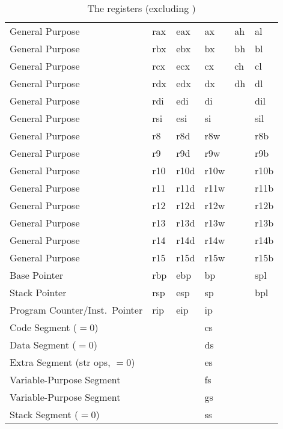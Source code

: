 \begin{table*}
  \centering
  \appto\theadfont{\normalcolor\normalfont}
  \caption{The  registers (excluding )}\label{tbl:regs}
  \begin{threeparttable}
    \begin{tabular}{lAAAAA}
      \toprule
       &  &  &
       &  &  \\
      \midrule
      General Purpose & rax & eax & ax & ah & al \\
      General Purpose & rbx & ebx & bx & bh & bl \\
      General Purpose & rcx & ecx & cx & ch & cl \\
      General Purpose & rdx & edx & dx & dh & dl \\
      General Purpose & rdi & edi & di && dil \\
      General Purpose & rsi & esi & si && sil \\
      General Purpose & r8 & r8d & r8w && r8b \\
      General Purpose & r9 & r9d & r9w && r9b \\
      General Purpose & r10 & r10d & r10w && r10b \\
      General Purpose & r11 & r11d & r11w && r11b \\
      General Purpose & r12 & r12d & r12w && r12b \\
      General Purpose & r13 & r13d & r13w && r13b \\
      General Purpose & r14 & r14d & r14w && r14b \\
      General Purpose & r15 & r15d & r15w && r15b \\
      Base Pointer & rbp & ebp & bp && spl \\
      Stack Pointer & rsp & esp & sp && bpl \\
      Program Counter/Inst.\ Pointer & rip & eip & ip && \\
      Code Segment ($=0$) &&& cs && \\
      Data Segment ($=0$) &&& ds && \\
      Extra Segment (str ops, $=0$) &&& es && \\
      Variable-Purpose Segment &&& fs && \\
      Variable-Purpose Segment &&& gs && \\
      Stack Segment ($=0$) &&& ss && \\

\end{tabular}
\end{threeparttable}
\end{table*}
